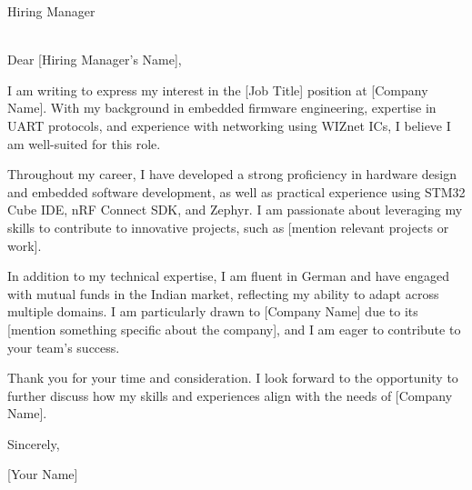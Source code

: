 \documentclass[a4paper,10pt]{letter}
\begin{document}
\begin{letter}{%
Hiring Manager \\ 
[Company Name] \\ 
[Company Address]}

\opening{Dear [Hiring Manager's Name],}

I am writing to express my interest in the [Job Title] position at [Company Name]. With my background in embedded firmware engineering, expertise in UART protocols, and experience with networking using WIZnet ICs, I believe I am well-suited for this role. 

Throughout my career, I have developed a strong proficiency in hardware design and embedded software development, as well as practical experience using STM32 Cube IDE, nRF Connect SDK, and Zephyr. I am passionate about leveraging my skills to contribute to innovative projects, such as [mention relevant projects or work].

In addition to my technical expertise, I am fluent in German and have engaged with mutual funds in the Indian market, reflecting my ability to adapt across multiple domains. I am particularly drawn to [Company Name] due to its [mention something specific about the company], and I am eager to contribute to your team’s success.

Thank you for your time and consideration. I look forward to the opportunity to further discuss how my skills and experiences align with the needs of [Company Name]. 

\closing{Sincerely,}
[Your Name]

\end{letter}
\end{document}
